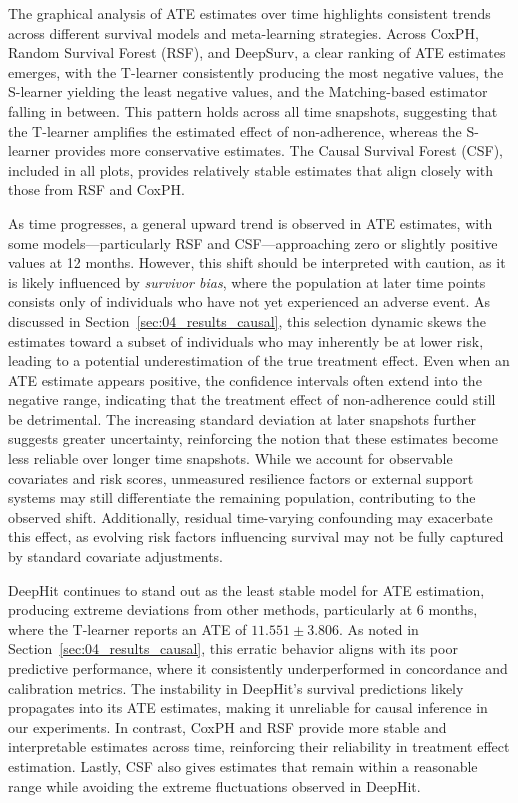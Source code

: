 The graphical analysis of ATE estimates over time highlights consistent trends across different survival models and meta-learning strategies. Across CoxPH, Random Survival Forest (RSF), and DeepSurv, a clear ranking of ATE estimates emerges, with the T-learner consistently producing the most negative values, the S-learner yielding the least negative values, and the Matching-based estimator falling in between. This pattern holds across all time snapshots, suggesting that the T-learner amplifies the estimated effect of non-adherence, whereas the S-learner provides more conservative estimates. The Causal Survival Forest (CSF), included in all plots, provides relatively stable estimates that align closely with those from RSF and CoxPH.

As time progresses, a general upward trend is observed in ATE estimates, with some models—particularly RSF and CSF—approaching zero or slightly positive values at 12 months. However, this shift should be interpreted with caution, as it is likely influenced by \textit{survivor bias}, where the population at later time points consists only of individuals who have not yet experienced an adverse event. As discussed in Section~\ref{sec:04_results_causal}, this selection dynamic skews the estimates toward a subset of individuals who may inherently be at lower risk, leading to a potential underestimation of the true treatment effect. Even when an ATE estimate appears positive, the confidence intervals often extend into the negative range, indicating that the treatment effect of non-adherence could still be detrimental. The increasing standard deviation at later snapshots further suggests greater uncertainty, reinforcing the notion that these estimates become less reliable over longer time snapshots. While we account for observable covariates and risk scores, unmeasured resilience factors or external support systems may still differentiate the remaining population, contributing to the observed shift. Additionally, residual time-varying confounding may exacerbate this effect, as evolving risk factors influencing survival may not be fully captured by standard covariate adjustments. 

DeepHit continues to stand out as the least stable model for ATE estimation, producing extreme deviations from other methods, particularly at 6 months, where the T-learner reports an ATE of \(11.551 \pm 3.806\). As noted in Section~\ref{sec:04_results_causal}, this erratic behavior aligns with its poor predictive performance, where it consistently underperformed in concordance and calibration metrics. The instability in DeepHit’s survival predictions likely propagates into its ATE estimates, making it unreliable for causal inference in our experiments. In contrast, CoxPH and RSF provide more stable and interpretable estimates across time, reinforcing their reliability in treatment effect estimation. Lastly, CSF also gives estimates that remain within a reasonable range while avoiding the extreme fluctuations observed in DeepHit.

